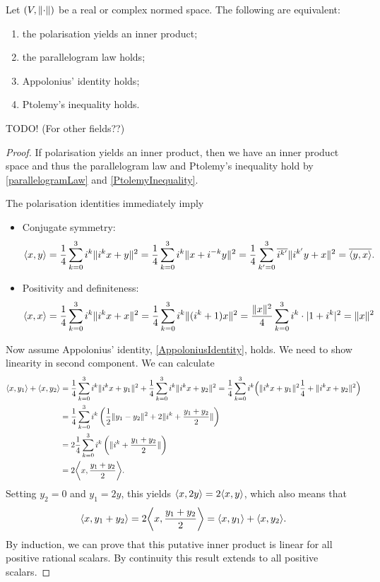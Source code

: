 \begin{theorem} \label{JordanVonNeumann}
Let $\sSet{V,\norm{\cdot}}$ be a real or complex normed space. The following are equivalent:
\begin{enumerate}
\item the polarisation yields an inner product;
\item the parallelogram law holds;
\item Appolonius' identity holds;
\item Ptolemy's inequality holds.
\end{enumerate}
\end{theorem}
TODO! (For other fields??)
\begin{proof}
If polarisation yields an inner product, then we have an inner product space and thus the parallelogram law and Ptolemy's inequality hold by \ref{parallelogramLaw} and \ref{PtolemyInequality}.

The polarisation identities immediately imply
\begin{itemize}
\item Conjugate symmetry:
\[ \inner{x,y} = \frac{1}{4}\sum_{k=0}^3i^k\norm{i^k x+ y}^2 = \frac{1}{4}\sum_{k=0}^3i^k\norm{x+ i^{-k}y}^2 = \frac{1}{4}\sum_{k'=0}^3\overline{i^{k'}}\norm{i^{k'}y+ x}^2 = \overline{\inner{y,x}}. \]
\item Positivity and definiteness:
\[ \inner{x,x} = \frac{1}{4}\sum_{k=0}^3i^k\norm{i^k x+ x}^2 = \frac{1}{4}\sum_{k=0}^3i^k\norm{(i^k+1)x}^2 = \frac{\norm{x}^2}{4}\sum_{k=0}^3 i^k\cdot |1+i^k|^2 = \norm{x}^2 \]
\end{itemize}
Now assume Appolonius' identity, \ref{AppoloniusIdentity}, holds. We need to show linearity in second component.
We can calculate
\begin{align*}
\inner{x,y_1} + \inner{x,y_2} &= \frac{1}{4}\sum_{k=0}^3i^k\norm{i^k x+ y_1}^2 + \frac{1}{4}\sum_{k=0}^3i^k\norm{i^k x+ y_2}^2 = \frac{1}{4}\sum_{k=0}^3i^k\Big(\norm{i^k x+ y_1}^2\frac{1}{4} + \norm{i^k x+ y_2}^2\Big) \\
&= \frac{1}{4}\sum_{k=0}^3i^k\left(\frac{1}{2}\norm{y_1-y_2}^2 + 2\norm{i^k+\frac{y_1+y_2}{2}}\right) \\
&= 2\frac{1}{4}\sum_{k=0}^3i^k\left(\norm{i^k+\frac{y_1+y_2}{2}}\right) \\
&= 2\inner{x,\frac{y_1+ y_2}{2}}.
\end{align*}
Setting $y_2 = 0$ and $y_1 = 2y$, this yields $\inner{x,2y} = 2\inner{x,y}$, which also means that
\[ \inner{x,y_1+y_2} = 2\inner{x,\frac{y_1+ y_2}{2}} = \inner{x,y_1} + \inner{x,y_2}. \]
By induction, we can prove that this putative inner product is linear for all positive rational scalars. By continuity this result extends to all positive scalars.


\end{proof}
